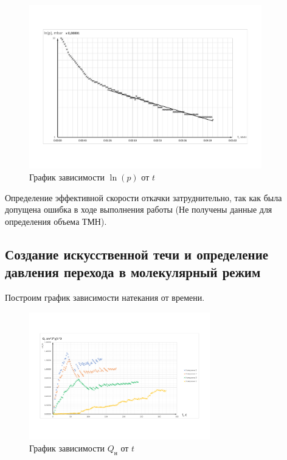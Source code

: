 \documentclass[12pt,a4paper]{article}
\begin{document}
	\begin{figure}[h!]
		\begin{center}
			\includegraphics[width = 0.9\textwidth]{Depends_preasure_of_time_tmn}
			\caption{График зависимости $\ln (p) $ от $t$}
			\label{fig:Depends_preasure_of_time_tmn}
		\end{center}
	\end{figure}	
	
	Определение эффективной скорости откачки затруднительно, так как была допущена ошибка в ходе выполнения работы (Не получены данные для определения объема ТМН).
	
	\subsection{Создание искусственной течи и определение давления перехода в молекулярный режим}
	
	Построим график зависимости натекания от времени.
	
	\begin{figure}[h!]
		\begin{center}
			\includegraphics[width = 0.7\textwidth]{Natekanie}
			\caption{График зависимости $Q_{\text{н}} $ от $t$}
			\label{fig:Natekanie}
		\end{center}
	\end{figure}	
	
\end{document}

